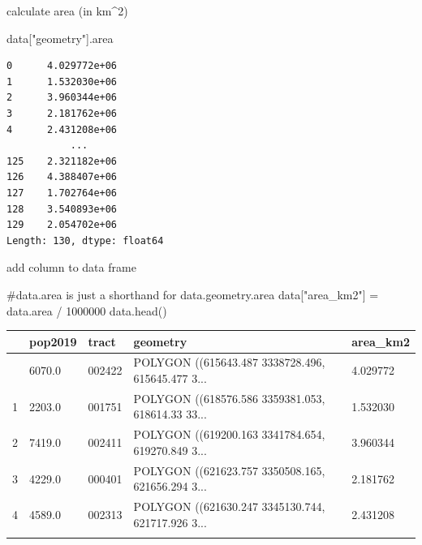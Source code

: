 \documentclass[
  ignorenonframetext,
]{beamer}
\newenvironment{Shaded}{\begin{snugshade}}{\end{snugshade}}
\newcommand{\CommentTok}[1]{\textcolor[rgb]{0.37,0.37,0.37}{#1}}
\newcommand{\DecValTok}[1]{\textcolor[rgb]{0.68,0.00,0.00}{#1}}
\newcommand{\NormalTok}[1]{\textcolor[rgb]{0.00,0.23,0.31}{#1}}
\newcommand{\OperatorTok}[1]{\textcolor[rgb]{0.37,0.37,0.37}{#1}}
\newcommand{\StringTok}[1]{\textcolor[rgb]{0.13,0.47,0.30}{#1}}
\begin{document}
\begin{frame}[fragile]{calculate area (in km\^{}2)}
\label{calculate-area-in-km2}
\begin{Shaded}
\begin{Highlighting}[]
\NormalTok{data[}\StringTok{"geometry"}\NormalTok{].area}
\end{Highlighting}
\end{Shaded}

\begin{verbatim}
0      4.029772e+06
1      1.532030e+06
2      3.960344e+06
3      2.181762e+06
4      2.431208e+06
           ...     
125    2.321182e+06
126    4.388407e+06
127    1.702764e+06
128    3.540893e+06
129    2.054702e+06
Length: 130, dtype: float64
\end{verbatim}
\end{frame}

\begin{frame}[fragile]{add column to data frame}
\label{add-column-to-data-frame}
\begin{Shaded}
\begin{Highlighting}[]
\CommentTok{\#data.area is just a shorthand for data.geometry.area}
\NormalTok{data[}\StringTok{"area\_km2"}\NormalTok{] }\OperatorTok{=}\NormalTok{ data.area }\OperatorTok{/} \DecValTok{1000000}
\NormalTok{data.head()}
\end{Highlighting}
\end{Shaded}

\begin{longtable}[]{@{}lllll@{}}
\toprule\noalign{}
& pop2019 & tract & geometry & area\_km2 \\
\midrule\noalign{}
\endhead
0 & 6070.0 & 002422 & POLYGON ((615643.487 3338728.496, 615645.477 3...
& 4.029772 \\
1 & 2203.0 & 001751 & POLYGON ((618576.586 3359381.053, 618614.33 33...
& 1.532030 \\
2 & 7419.0 & 002411 & POLYGON ((619200.163 3341784.654, 619270.849 3...
& 3.960344 \\
3 & 4229.0 & 000401 & POLYGON ((621623.757 3350508.165, 621656.294 3...
& 2.181762 \\
4 & 4589.0 & 002313 & POLYGON ((621630.247 3345130.744, 621717.926 3...
& 2.431208 \\
\bottomrule\noalign{}
\end{longtable}
\end{frame}
\end{document}
